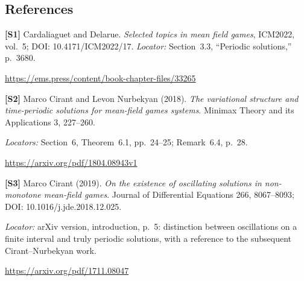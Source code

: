 \documentclass[11pt,a4paper]{article}
\begin{document}
\subsection*{References}
\begingroup\footnotesize\raggedright
{\footnotesize\raggedright
\textbf{[S1]} Cardaliaguet and Delarue. \emph{Selected topics in mean field games}, ICM2022, vol.~5; DOI: 10.4171/ICM2022/17. \textit{Locator:} Section~3.3, ``Periodic solutions,'' p.~3680.\par
\url{https://ems.press/content/book-chapter-files/33265}\par\smallskip
\textbf{[S2]} Marco Cirant and Levon Nurbekyan (2018). \emph{The variational structure and time-periodic solutions for mean-field games systems}. Minimax Theory and its Applications 3, 227--260.\par
\textit{Locators:} Section~6, Theorem~6.1, pp.~24--25; Remark~6.4, p.~28.\par
\url{https://arxiv.org/pdf/1804.08943v1}\par\smallskip
\textbf{[S3]} Marco Cirant (2019). \emph{On the existence of oscillating solutions in non-monotone mean-field games}. Journal of Differential Equations 266, 8067--8093; DOI: 10.1016/j.jde.2018.12.025.\par
\textit{Locator:} arXiv version, introduction, p.~5: distinction between oscillations on a finite interval and truly periodic solutions, with a reference to the subsequent Cirant--Nurbekyan work.\par
\url{https://arxiv.org/pdf/1711.08047}\par}



\par\endgroup
\end{document}
